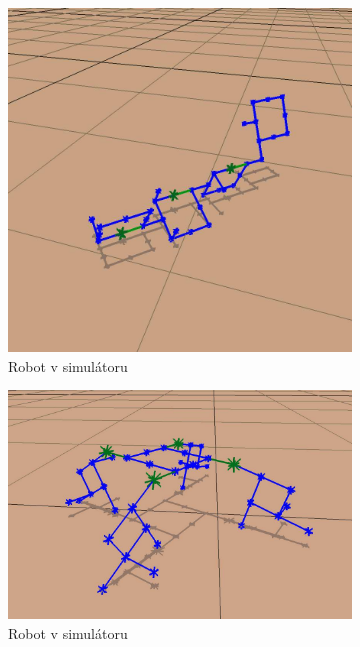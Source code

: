 \begin{figure}
    \centering
    \begin{subfigure}{.33\textwidth}
        \centering
        \includegraphics[width=.9\linewidth]{obrazky/hornby_model_2_simulace.png}
        \caption{Robot v simulátoru}
        \label{fig:hornby_roboti_real}
    \end{subfigure}
    \begin{subfigure}{.33\textwidth}
        \centering
        \includegraphics[width=.9\linewidth]{obrazky/hornby_model_1_simulace.png}
        \caption{Robot v simulátoru}
        \label{fig:hornby_roboti_1_simulace}
    \end{subfigure}%
    \begin{subfigure}{.33\textwidth}

\end{subfigure}
\end{figure}
